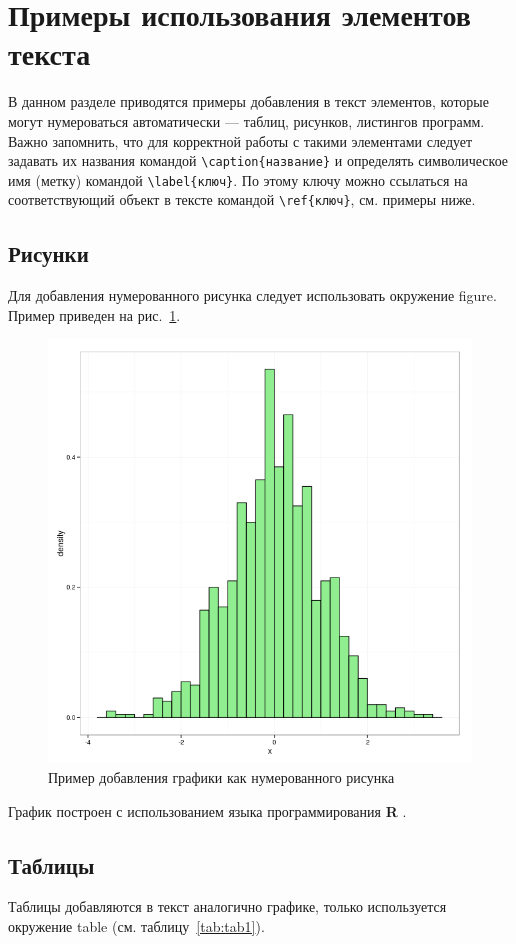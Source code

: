 
\section{Примеры использования элементов текста}

В данном разделе приводятся примеры добавления в текст элементов, которые могут нумероваться автоматически --- таблиц, рисунков, листингов программ. Важно запомнить, что для корректной работы с такими элементами следует задавать их названия командой \Verb|\caption{название}| и определять символическое имя (метку) командой \Verb|\label{ключ}|. По этому ключу можно ссылаться на соответствующий объект в тексте командой \Verb|\ref{ключ}|, см. примеры ниже.

\subsection{Рисунки}

Для добавления нумерованного рисунка следует использовать окружение figure. Пример приведен на рис.~\ref{fig:ris1}.

\begin{figure}[H]
\centering
\includegraphics[width=0.5\linewidth]{pics/ris1} %
\caption{Пример добавления графики как нумерованного рисунка}
\label{fig:ris1} %
\end{figure}

График построен с использованием языка программирования \textbf{R} \cite{RManual}.

\subsection{Таблицы}

Таблицы добавляются в текст аналогично графике, только используется окружение table (см. таблицу~\ref{tab:tab1}).

